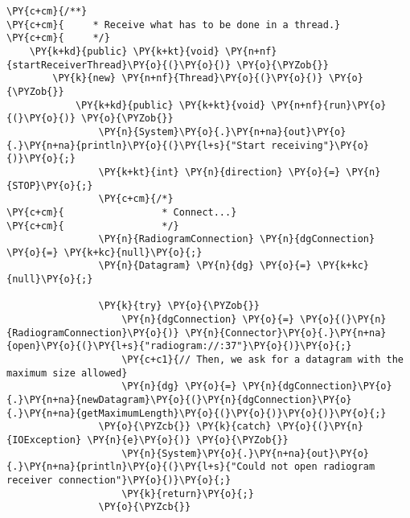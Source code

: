 \begin{Verbatim}[commandchars=\\\{\}]
    \PY{c+cm}{/**}
\PY{c+cm}{     * Receive what has to be done in a thread.}
\PY{c+cm}{     */}
    \PY{k+kd}{public} \PY{k+kt}{void} \PY{n+nf}{startReceiverThread}\PY{o}{(}\PY{o}{)} \PY{o}{\PYZob{}}
        \PY{k}{new} \PY{n+nf}{Thread}\PY{o}{(}\PY{o}{)} \PY{o}{\PYZob{}}
            \PY{k+kd}{public} \PY{k+kt}{void} \PY{n+nf}{run}\PY{o}{(}\PY{o}{)} \PY{o}{\PYZob{}}
                \PY{n}{System}\PY{o}{.}\PY{n+na}{out}\PY{o}{.}\PY{n+na}{println}\PY{o}{(}\PY{l+s}{"Start receiving"}\PY{o}{)}\PY{o}{;}
                \PY{k+kt}{int} \PY{n}{direction} \PY{o}{=} \PY{n}{STOP}\PY{o}{;}
                \PY{c+cm}{/*}
\PY{c+cm}{                 * Connect...}
\PY{c+cm}{                 */}
                \PY{n}{RadiogramConnection} \PY{n}{dgConnection} \PY{o}{=} \PY{k+kc}{null}\PY{o}{;}
                \PY{n}{Datagram} \PY{n}{dg} \PY{o}{=} \PY{k+kc}{null}\PY{o}{;}

                \PY{k}{try} \PY{o}{\PYZob{}}
                    \PY{n}{dgConnection} \PY{o}{=} \PY{o}{(}\PY{n}{RadiogramConnection}\PY{o}{)} \PY{n}{Connector}\PY{o}{.}\PY{n+na}{open}\PY{o}{(}\PY{l+s}{"radiogram://:37"}\PY{o}{)}\PY{o}{;}
                    \PY{c+c1}{// Then, we ask for a datagram with the maximum size allowed}
                    \PY{n}{dg} \PY{o}{=} \PY{n}{dgConnection}\PY{o}{.}\PY{n+na}{newDatagram}\PY{o}{(}\PY{n}{dgConnection}\PY{o}{.}\PY{n+na}{getMaximumLength}\PY{o}{(}\PY{o}{)}\PY{o}{)}\PY{o}{;}
                \PY{o}{\PYZcb{}} \PY{k}{catch} \PY{o}{(}\PY{n}{IOException} \PY{n}{e}\PY{o}{)} \PY{o}{\PYZob{}}
                    \PY{n}{System}\PY{o}{.}\PY{n+na}{out}\PY{o}{.}\PY{n+na}{println}\PY{o}{(}\PY{l+s}{"Could not open radiogram receiver connection"}\PY{o}{)}\PY{o}{;}
                    \PY{k}{return}\PY{o}{;}
                \PY{o}{\PYZcb{}}


\end{Verbatim}
